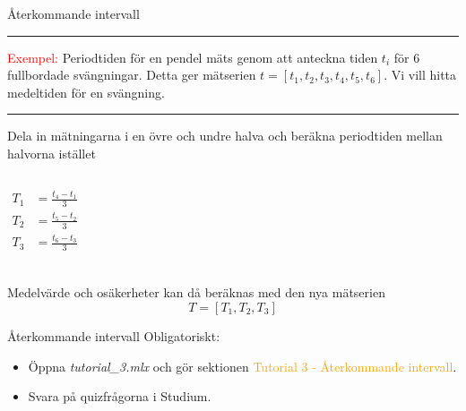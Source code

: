 \documentclass[9pt]{beamer}
\begin{document}
    \begin{frame}{Återkommande intervall}
        \hrule \vspace{0.1cm}
        \textcolor{red}{Exempel:}
        Periodtiden för en pendel mäts genom att anteckna tiden $t_i$ för 6 fullbordade svängningar.
        Detta ger mätserien $t = [t_1, t_2, t_3, t_4, t_5, t_6]$. Vi vill hitta medeltiden för en svängning.
        \vspace{0.1cm} \hrule
        \vfill
        
        
        
        \onslide<+->
        Dela in mätningarna i en övre och undre halva och beräkna periodtiden mellan halvorna istället
        \begin{columns}
            \begin{align*}
                T_1 &= \frac{t_4 - t_1}{3}\\
                T_2 &= \frac{t_5 - t_2}{3}\\
                T_3 &= \frac{t_6 - t_3}{3}\\
            \end{align*}
        \end{columns}
    Medelvärde och osäkerheter kan då beräknas med den nya mätserien 
    \begin{equation*}
        T = [T_1, T_2, T_3]    
    \end{equation*}
    
    \end{frame}

    \begin{frame}{Återkommande intervall}
        Obligatoriskt: 
        \begin{itemize}
            \item Öppna \textit{tutorial\_3.mlx} och gör sektionen \textcolor{orange}{Tutorial 3 - Återkommande intervall}.
            \item Svara på quizfrågorna i Studium.
        \end{itemize}
    \end{frame}
\end{document}
